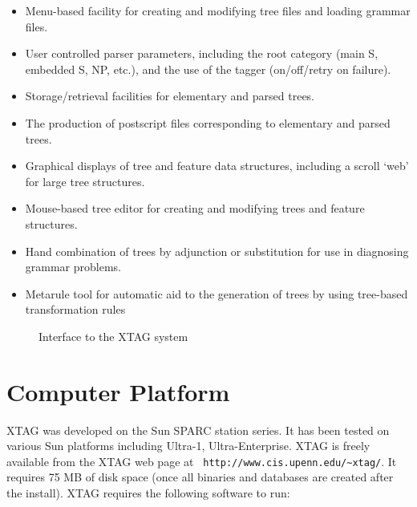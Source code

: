 \begin{itemize}

\item Menu-based facility for creating and modifying tree files and 
loading grammar files.

\item User controlled parser parameters, including the root
category (main S, embedded S, NP, etc.), and the use of the tagger
(on/off/retry on failure).

\item Storage/retrieval facilities for elementary and parsed trees.

\item The production of postscript files corresponding to elementary
and parsed trees.

\item Graphical displays of tree and feature data structures,
including a scroll `web' for large tree structures.

\item Mouse-based tree editor for creating and modifying trees and
feature structures.

\item Hand combination of trees by adjunction or substitution for use
in diagnosing grammar problems.

\item Metarule tool for automatic aid to the generation of trees by using 
tree-based transformation rules
 
\end{itemize}

\begin{figure}[htb]
\centering
\mbox{}
{}
\caption[XTAG Interface]{Interface to the XTAG system}
\label{xtag-interface}
\end{figure}

\section{Computer Platform}


XTAG was developed on the Sun SPARC station series. It has been tested
on various Sun platforms including Ultra-1, Ultra-Enterprise. XTAG is
freely available from the XTAG web page at {\tt
  http://www.cis.upenn.edu/\~{}xtag/}. It requires 75 MB of disk space
(once all binaries and databases are created after the install). XTAG
requires the following software to run:

